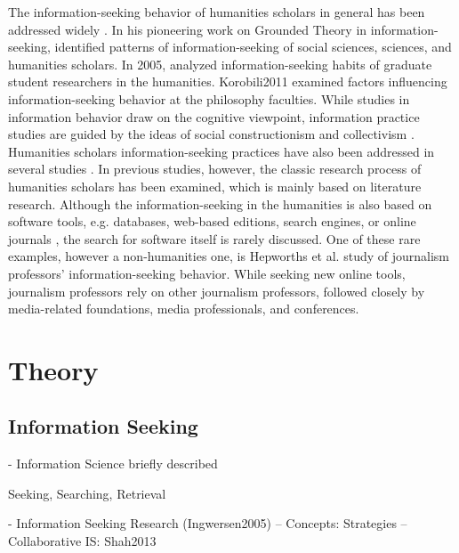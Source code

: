 \documentclass[12pt,a4paper,titlepage,oneside,abstract=true,toc=listof,toc=bibliography]{scrreprt}
\begin{document}
The information-seeking behavior of humanities scholars in general has been addressed widely \citep[e.g.]{Barrett2005, Bronstein2007, Bronstein2007a, Catalano2013, Ellis1993, Given2018, Korobili2011, Liew2006, Rimmer2006}. In his pioneering work on Grounded Theory in information-seeking, \citet{Ellis1993} identified patterns of information-seeking of social sciences, sciences, and humanities scholars. In 2005, \citet{Barrett2005} analyzed information-seeking habits of graduate student researchers in the humanities. Korobili{2011} examined factors influencing information-seeking behavior at the philosophy faculties. While studies in information behavior draw on the cognitive viewpoint, information practice studies are guided by the ideas of social constructionism and collectivism \citep{Savolainen2007, Talja2005, Talja2007}. Humanities scholars information-seeking practices have also been addressed in several studies \citep{Benardou2013, Bulger2011, Given2018, Palmer2009}. In previous studies, however, the classic research process of humanities scholars has been examined, which is mainly based on literature research. Although the information-seeking in the humanities is also based on software tools, e.g. databases, web-based editions, search engines, or online journals \citep{Barrett2005, Rimmer2006}, the search for software itself is rarely discussed. One of these rare examples, however a non-humanities one, is Hepworths et al. \citeyearpar{Hepworth2017} study of journalism professors' information-seeking behavior. While seeking new online tools, journalism professors rely on other journalism professors, followed closely by media-related foundations, media professionals, and conferences.

\chapter{Theory}

\section{Information Seeking}
- Information Science briefly described

	Seeking, Searching, Retrieval

- Information Seeking Research (Ingwersen2005)
-- Concepts: Strategies
-- Collaborative IS: Shah2013 
\end{document}
